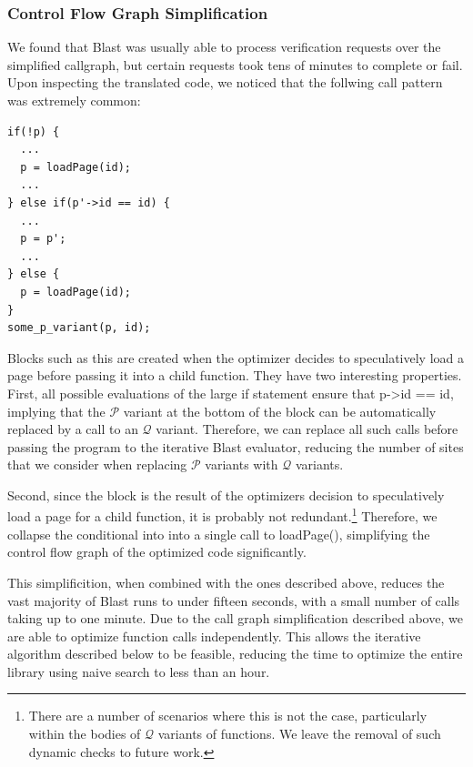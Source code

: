 \documentclass[10pt,letterpaper,twocolumn,english]{article}
\newcommand{\pin}{loadPage()\xspace}
\newcommand{\fP}{{$\mathcal P$}\xspace}
\newcommand{\fQ}{{$\mathcal Q$}\xspace}
\begin{document}
\subsubsection{Control Flow Graph Simplification}

We found that Blast was usually able to process verification requests
over the simplified callgraph, but certain requests took tens of
minutes to complete or fail.  Upon inspecting the translated code, we
noticed that the follwing call pattern was extremely common:

\begin{verbatim}
if(!p) { 
  ...
  p = loadPage(id);
  ...
} else if(p'->id == id) {
  ...
  p = p';
  ...
} else {
  p = loadPage(id);
}
some_p_variant(p, id);
\end{verbatim}

Blocks such as this are created when the optimizer decides to
speculatively load a page before passing it into a child function.
They have two interesting properties.  First, all possible evaluations
of the large if statement ensure that p->id == id, implying that the
\fP variant at the bottom of the block can be automatically replaced
by a call to an \fQ variant.  Therefore, we can replace all such calls
before passing the program to the iterative Blast evaluator, reducing
the number of sites that we consider when replacing \fP variants with
\fQ variants.

Second, since the block is the result of the optimizers decision to
speculatively load a page for a child function, it is probably not
redundant.\footnote{There are a number of scenarios where this is not
the case, particularly within the bodies of \fQ variants of functions.
We leave the removal of such dynamic checks to future work.}
Therefore, we collapse the conditional into into a single call to
\pin, simplifying the control flow graph of the optimized code
significantly.  

This simplificition, when combined with the ones described above,
reduces the vast majority of Blast runs to under fifteen seconds, with
a small number of calls taking up to one minute.  Due to the call graph
simplification described above, we are able to optimize function calls
independently.  This allows the iterative algorithm described below to
be feasible, reducing the time to optimize the entire library using
naive search to less than an hour.
\end{document}
